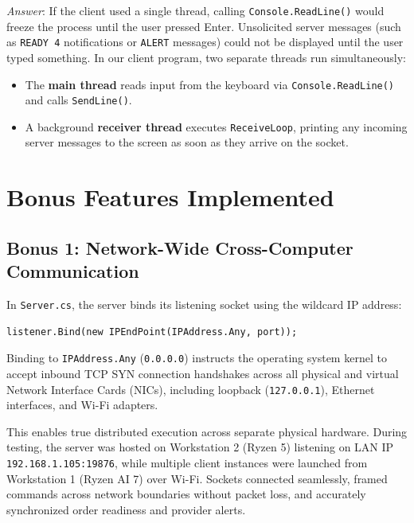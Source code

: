 \documentclass[11pt,a4paper]{article}
\begin{document}
\begin{enumerate}[label=\textbf{Q\arabic*.},leftmargin=*]
    \textit{Answer}: If the client used a single thread, calling \texttt{Console.ReadLine()} would freeze the process until the user pressed Enter. Unsolicited server messages (such as \texttt{READY 4} notifications or \texttt{ALERT} messages) could not be displayed until the user typed something. In our client program, two separate threads run simultaneously:
    \begin{itemize}
        \item The \textbf{main thread} reads input from the keyboard via \texttt{Console.ReadLine()} and calls \texttt{SendLine()}.
        \item A background \textbf{receiver thread} executes \texttt{ReceiveLoop}, printing any incoming server messages to the screen as soon as they arrive on the socket.
    \end{itemize}
\end{enumerate}

\section{Bonus Features Implemented}

\subsection{Bonus 1: Network-Wide Cross-Computer Communication}
In \texttt{Server.cs}, the server binds its listening socket using the wildcard IP address:
\begin{lstlisting}[language={[Sharp]C}]
listener.Bind(new IPEndPoint(IPAddress.Any, port));
\end{lstlisting}
Binding to \texttt{IPAddress.Any} (\texttt{0.0.0.0}) instructs the operating system kernel to accept inbound TCP SYN connection handshakes across all physical and virtual Network Interface Cards (NICs), including loopback (\texttt{127.0.0.1}), Ethernet interfaces, and Wi-Fi adapters. 

This enables true distributed execution across separate physical hardware. During testing, the server was hosted on Workstation 2 (Ryzen 5) listening on LAN IP \texttt{192.168.1.105:19876}, while multiple client instances were launched from Workstation 1 (Ryzen AI 7) over Wi-Fi. Sockets connected seamlessly, framed commands across network boundaries without packet loss, and accurately synchronized order readiness and provider alerts.
\end{document}
